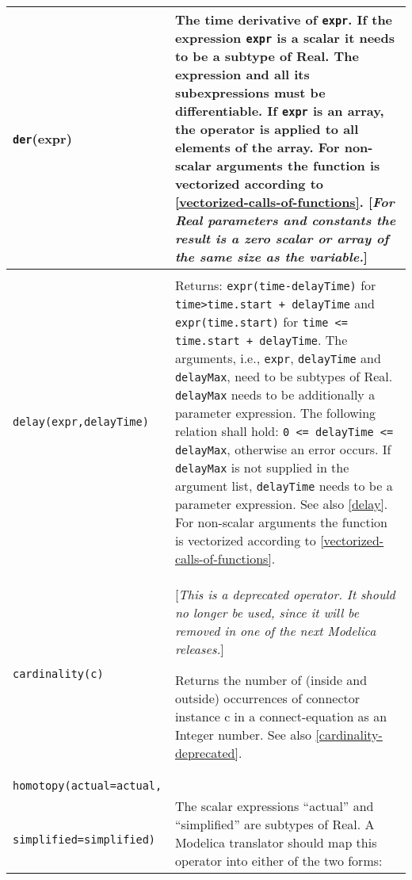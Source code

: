 \begin{longtable}{|p{5.1cm}|p{8cm}|} 
\hline \endhead

\lstinline!der!(expr) & 
The time derivative of \lstinline!expr!. If the expression \lstinline!expr! is a
scalar it needs to be a subtype of Real. The expression and all its
subexpressions must be differentiable. If \lstinline!expr! is an array, the operator
is applied to all elements of the array. For non-scalar arguments the
function is vectorized according to \autoref{vectorized-calls-of-functions}. {[}\emph{For Real
parameters and constants the result is a zero scalar or array of the
same size as the variable.}{]}\\ 
\hline

\begin{tabular}{@{}p{5.1cm}@{}}

\lstinline!delay(expr,delayTime,delayMax)!\\
\lstinline!delay(expr,delayTime)!
\end{tabular} & 
Returns: \lstinline!expr(time-delayTime)! for \lstinline!time>time.start + delayTime! and \lstinline!expr(time.start)! for \lstinline!time <= time.start + delayTime!. The arguments, i.e., \lstinline!expr!, \lstinline!delayTime! and \lstinline!delayMax!, need to be
subtypes of Real. \lstinline!delayMax! needs to be additionally a parameter
expression. The following relation shall hold: \lstinline!0 <= delayTime <= delayMax!, otherwise an error occurs. If \lstinline!delayMax! is not
supplied in the argument list, \lstinline!delayTime! needs to be a parameter
expression. See also \autoref{delay}. For non-scalar arguments the
function is vectorized according to \autoref{vectorized-calls-of-functions}.\\
\hline

\lstinline!cardinality(c)! & {[}\emph{This is a deprecated operator. It should no longer be used,
since it will be removed in one of the next Modelica releases.}{]}

Returns the number of (inside and outside) occurrences of connector
instance c in a connect-equation as an Integer number. See also \autoref{cardinality-deprecated}.\\ 
\hline

\lstinline!homotopy(actual=actual,!\\
\lstinline!   simplified=simplified)! & The scalar expressions ``actual'' and ``simplified'' are subtypes of
Real. A Modelica translator should map this operator into either of the
two forms:


\end{longtable}
